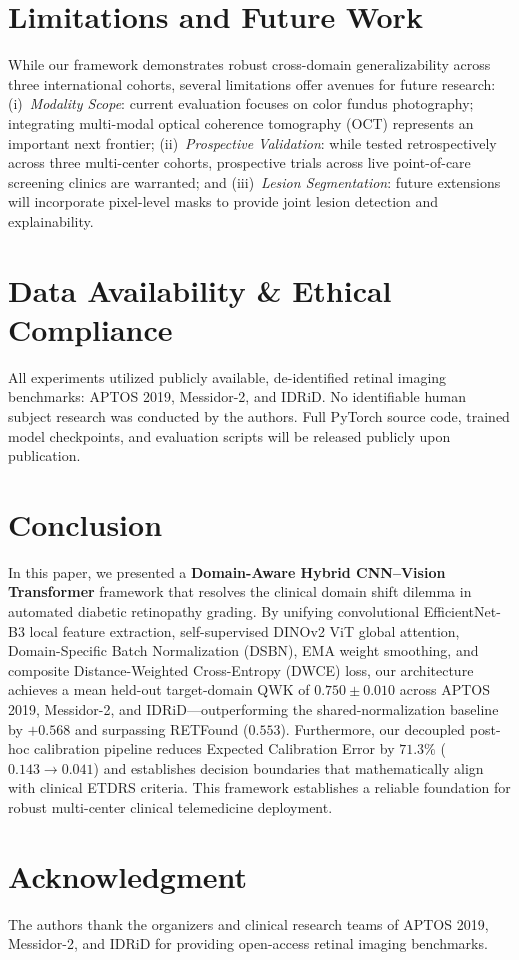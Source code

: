\documentclass[conference]{IEEEtran}
\begin{document}
\section{Limitations and Future Work}
While our framework demonstrates robust cross-domain generalizability across three international cohorts, several limitations offer avenues for future research: (i)~\emph{Modality Scope}: current evaluation focuses on color fundus photography; integrating multi-modal optical coherence tomography (OCT) represents an important next frontier; (ii)~\emph{Prospective Validation}: while tested retrospectively across three multi-center cohorts, prospective trials across live point-of-care screening clinics are warranted; and (iii)~\emph{Lesion Segmentation}: future extensions will incorporate pixel-level masks to provide joint lesion detection and explainability.

\section{Data Availability \& Ethical Compliance}
All experiments utilized publicly available, de-identified retinal imaging benchmarks: APTOS 2019, Messidor-2, and IDRiD. No identifiable human subject research was conducted by the authors. Full PyTorch source code, trained model checkpoints, and evaluation scripts will be released publicly upon publication.

\section{Conclusion}
In this paper, we presented a \textbf{Domain-Aware Hybrid CNN--Vision Transformer} framework that resolves the clinical domain shift dilemma in automated diabetic retinopathy grading. By unifying convolutional EfficientNet-B3 local feature extraction, self-supervised DINOv2 ViT global attention, Domain-Specific Batch Normalization (DSBN), EMA weight smoothing, and composite Distance-Weighted Cross-Entropy (DWCE) loss, our architecture achieves a mean held-out target-domain QWK of $\mathbf{0.750 \pm 0.010}$ across APTOS 2019, Messidor-2, and IDRiD---outperforming the shared-normalization baseline by $+0.568$ and surpassing RETFound ($0.553$). Furthermore, our decoupled post-hoc calibration pipeline reduces Expected Calibration Error by $71.3\%$ ($0.143 \rightarrow 0.041$) and establishes decision boundaries that mathematically align with clinical ETDRS criteria. This framework establishes a reliable foundation for robust multi-center clinical telemedicine deployment.

\section*{Acknowledgment}
The authors thank the organizers and clinical research teams of APTOS 2019, Messidor-2, and IDRiD for providing open-access retinal imaging benchmarks.



\end{document}
